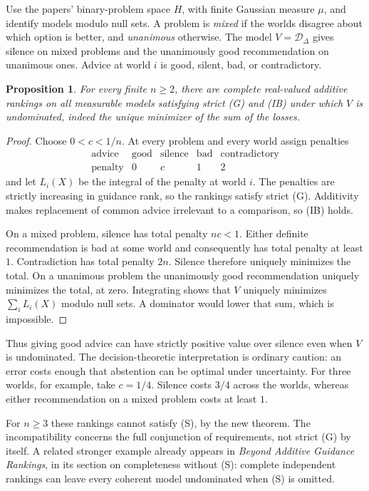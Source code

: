 \documentclass[11pt]{article}
\newtheorem{proposition}{Proposition}
\theoremstyle{remark}\newtheorem{remark}[proposition]{Remark}
\newcommand{\Dscr}{\mathcal D}
\begin{document}
Use the papers' binary-problem space $H$, with finite Gaussian measure
$\mu$, and identify models modulo null sets. A problem is \emph{mixed}
if the worlds disagree about which option is better, and
\emph{unanimous} otherwise. The model $V=\Dscr_\Delta$ gives silence on
mixed problems and the unanimously good recommendation on unanimous
ones. Advice at world $i$ is good, silent, bad, or contradictory.

\begin{proposition}\label{prop:strict}
For every finite $n\ge2$, there are complete real-valued additive rankings
on all measurable models satisfying strict (G) and (IB) under which $V$
is undominated, indeed the unique minimizer of the sum of the losses.
\end{proposition}
\begin{proof}
Choose $0<c<1/n$. At every problem and every world assign penalties
\[
 \begin{array}{c|cccc}
 \text{advice}&\text{good}&\text{silence}&\text{bad}&\text{contradictory}\\
 \hline
 \text{penalty}&0&c&1&2
 \end{array}
\]
and let $L_i(X)$ be the integral of the penalty at world $i$.
The penalties are strictly increasing in guidance rank, so the rankings
satisfy strict (G). Additivity makes replacement of common advice
irrelevant to a comparison, so (IB) holds.

On a mixed problem, silence has total penalty $nc<1$. Either definite
recommendation is bad at some world and consequently has total penalty
at least $1$. Contradiction has total penalty $2n$. Silence therefore
uniquely minimizes the total. On a unanimous problem the unanimously
good recommendation uniquely minimizes the total, at zero. Integrating
shows that $V$ uniquely minimizes $\sum_iL_i(X)$ modulo null sets.
A dominator would lower that sum, which is impossible.
\end{proof}

Thus giving good advice can have strictly positive value over silence
even when $V$ is undominated. The decision-theoretic interpretation is
ordinary caution: an error costs enough that abstention can be optimal
under uncertainty. For three worlds, for example, take $c=1/4$.
Silence costs $3/4$ across the worlds, whereas either recommendation on
a mixed problem costs at least $1$.

For $n\ge3$ these rankings cannot satisfy (S), by the new theorem.
The incompatibility concerns the full conjunction of requirements, not
strict (G) by itself. A related stronger example already appears in
\emph{Beyond Additive Guidance Rankings}, in its section on completeness
without (S): complete independent rankings can leave every coherent
model undominated when (S) is omitted.
\end{document}
